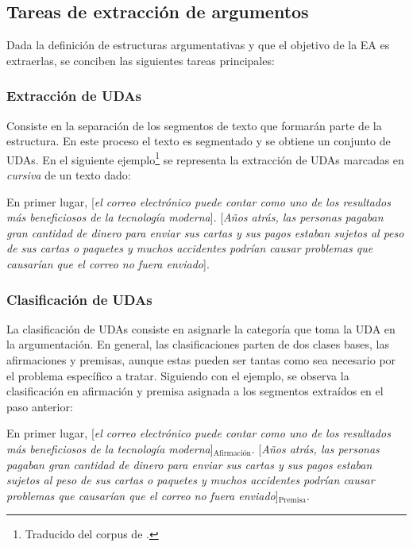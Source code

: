 \documentclass[a4paper,11pt,twocolumn,twoside]{article}
\begin{document}
\subsection{Tareas de extracción de argumentos}

Dada la definición de estructuras argumentativas y que el objetivo de la EA es extraerlas,
se conciben las siguientes tareas principales:

\subsubsection{Extracción de UDAs}

Consiste en la separación de los segmentos de texto que formarán parte de la estructura.
En este proceso el texto es segmentado y se obtiene un conjunto de UDAs. En el siguiente 
ejemplo\footnote{Traducido del corpus de
	\cite{stab2017parsing}
	.} se representa 
la extracción de UDAs marcadas en \textit{cursiva} de un texto dado:

\begin{adjustwidth}{25pt}{25pt}
	En primer lugar, [\textit{el correo electrónico puede contar como uno de los resultados
				más beneficiosos de la tecnología moderna}]. [\textit{Años atrás, las personas pagaban gran cantidad de dinero para
		enviar sus cartas y sus pagos estaban sujetos al peso de sus cartas o paquetes y muchos accidentes podrían 
		causar problemas que causarían que el correo no fuera enviado}].
\end{adjustwidth}

\subsubsection{Clasificación de UDAs}

La clasificación de UDAs consiste en asignarle la categoría que toma la UDA en la argumentación. En general, 
las clasificaciones parten de dos clases bases, las afirmaciones y premisas, aunque estas pueden ser tantas
como sea necesario por el problema específico a tratar. Siguiendo con el ejemplo, se observa la clasificación
en afirmación y premisa asignada a los segmentos extraídos en el paso anterior:

\begin{adjustwidth}{25pt}{25pt}
	En primer lugar, [\textit{el correo electrónico puede contar como uno de los resultados
				más beneficiosos de la tecnología moderna}]$_{\mathrm{\text{Afirmación}}}$. [\textit{Años atrás, las personas pagaban gran cantidad de dinero para
				enviar sus cartas y sus pagos estaban sujetos al peso de sus cartas o paquetes y muchos accidentes podrían 
				causar problemas que causarían que el correo no fuera enviado}]$_{\mathrm{Premisa}}$.
\end{adjustwidth}
\end{document}
